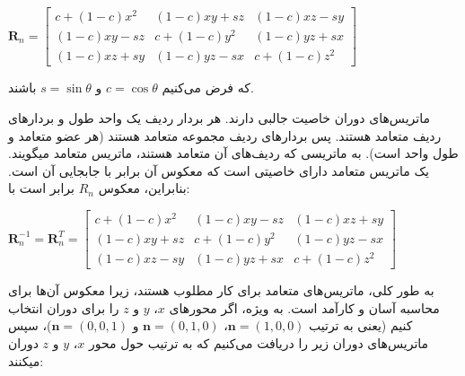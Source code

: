 {\begin{spacing}{1.5}
        \begin{center}
            $\textbf{R}_{n}=\begin{bmatrix}
                                c+(1-c)x^{2} & (1-c)xy+sz   & (1-c)xz-sy \\
                                (1-c)xy-sz   & c+(1-c)y^{2} & (1-c)yz+sx \\
                                (1-c)xz+sy   & (1-c)yz-sx   & c+(1-c)z^{2}
            \end{bmatrix}$
        \end{center}

        که فرض می‌کنیم $c=\cos\theta$ و $s=\sin\theta$ باشند.

        ماتریس‌های دوران خاصیت جالبی دارند. هر بردار ردیف یک واحد طول و بردارهای ردیف متعامد هستند.
        پس بردارهای ردیف مجموعه متعامد هستند (هر عضو متعامد و طول واحد است).
        به ماتریسی که ردیف‌های آن متعامد هستند، ماتریس متعامد میگویند.
        یک ماتریس متعامد دارای خاصیتی است که معکوس آن برابر با جابجایی آن است. بنابراین، معکوس $R_{n}$ برابر است با:

        \begin{center}
            $\textbf{R}^{-1}_{n}=\textbf{R}^{T}_{n}=\begin{bmatrix}
                                                        c+(1-c)x^{2} & (1-c)xy-sz   & (1-c)xz+sy \\
                                                        (1-c)xy+sz   & c+(1-c)y^{2} & (1-c)yz-sx \\
                                                        (1-c)xz-sy   & (1-c)yz+sx   & c+(1-c)z^{2}
            \end{bmatrix}$
        \end{center}

        به طور کلی، ماتریس‌های متعامد برای کار مطلوب هستند، زیرا معکوس آن‌ها برای محاسبه آسان و کارآمد است.
        به ویژه، اگر محورهای $x$، $y$ و $z$ را برای دوران انتخاب کنیم (یعنی به ترتیب $\textbf{n}=(1,0,0)$، $\textbf{n}=(0,1,0)$ و $\textbf{n}=(0,0,1)$)،
        سپس ماتریس‌های دوران زیر را دریافت می‌کنیم که به ترتیب حول محور $x$، $y$ و $z$ دوران میکنند:


\end{spacing}}
